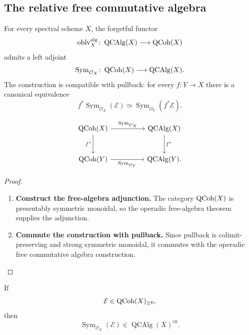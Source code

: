 \subsection{The relative free commutative algebra}

\begin{proposition}
\label{prop:relative-free-commutative-algebra}
For every spectral scheme $X$, the forgetful functor
\[
    \operatorname{oblv}^{\mathrm{alg}}_{X}
    \colon
    \operatorname{QCAlg}(X)
    \longrightarrow
    \operatorname{QCoh}(X)
\]
admits a left adjoint
\[
    \operatorname{Sym}_{\mathcal O_X}
    \colon
    \operatorname{QCoh}(X)
    \longrightarrow
    \operatorname{QCAlg}(X).
\]
The construction is compatible with pullback: for every $f:Y\to X$ there
is a canonical equivalence
\[
    f^*
    \operatorname{Sym}_{\mathcal O_X}(\mathcal E)
    \simeq
    \operatorname{Sym}_{\mathcal O_Y}(f^*\mathcal E).
\]
\end{proposition}

\[
\begin{tikzcd}[column sep=huge, row sep=large]
    \QCoh(X)
        \arrow[r, "{\operatorname{Sym}_{\mathcal O_X}}"]
        \arrow[d, "{f^*}"']
    &
    \operatorname{QCAlg}(X)
        \arrow[d, "{f^*}"]
    \\
    \QCoh(Y)
        \arrow[r, "{\operatorname{Sym}_{\mathcal O_Y}}"']
    &
    \operatorname{QCAlg}(Y).
\end{tikzcd}
\]


\begin{proof}
\leavevmode
\begin{enumerate}[label=\textup{(\arabic*)}]
    \item \textbf{Construct the free-algebra adjunction.}
    The category $\operatorname{QCoh}(X)$ is presentably symmetric monoidal, so the
    operadic free-algebra theorem supplies the adjunction.

    \item \textbf{Commute the construction with pullback.}
    Since pullback is
    colimit-preserving and strong symmetric monoidal, it commutes with the
    operadic free commutative algebra construction.
\end{enumerate}
\end{proof}

\begin{proposition}
\label{prop:relative-free-algebra-connective}
If
\[
    \mathcal E
    \in
    \operatorname{QCoh}(X)_{\geq0},
\]
then
\[
    \operatorname{Sym}_{\mathcal O_X}(\mathcal E)
    \in
    \operatorname{QCAlg}(X)^{\mathrm{cn}}.
\]
\end{proposition}

